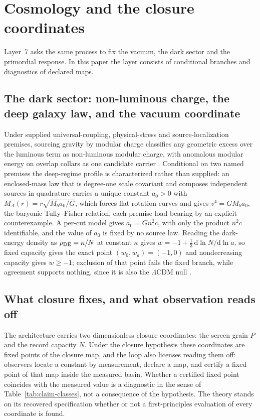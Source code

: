 \documentclass[11pt]{article}
\theoremstyle{definition}
\theoremstyle{remark}
\begin{document}
\section{Cosmology and the closure coordinates}
\label{sec:cosmology}

Layer~7 asks the same process to fix the vacuum, the dark sector and the
primordial response. In this paper the layer consists of conditional
branches and diagnostics of declared maps.

\subsection{The dark sector: non-luminous charge, the deep galaxy law, and the vacuum coordinate}
\label{sec:dark-sector}

Under supplied universal-coupling, physical-stress and source-localization
premises, sourcing gravity by modular charge classifies any geometric excess
over the luminous term as non-luminous modular charge, with anomalous
modular energy on overlap collars as one candidate carrier
\cite{ophdarkmatter}. Conditional on two named premises the deep-regime
profile is characterized rather than supplied: an enclosed-mass law that is
degree-one scale covariant and composes independent sources in quadrature
carries a unique constant $a_0>0$ with $M_A(r)=r\sqrt{M_ba_0/G}$, which forces flat rotation curves and
gives $v^4=GM_ba_0$, the baryonic Tully--Fisher relation, each premise
load-bearing by an explicit counterexample. A per-cut model
gives $a_0=Gn^2c$, with only the product $n^2c$ identifiable, and the value
of $a_0$ is fixed by no source law. Reading the dark-energy density as
$\rho_{\rm DE}=\kappa/N$ at constant $\kappa$ gives
$w=-1+\tfrac13\,\mathrm d\ln N/\mathrm d\ln a$, so fixed capacity gives the
exact point $(w_0,w_a)=(-1,0)$ and nondecreasing capacity gives $w\ge-1$;
exclusion of that point fails the fixed branch, while agreement supports
nothing, since it is also the $\Lambda$CDM null \cite{ophvacuum}.

\subsection{What closure fixes, and what observation reads off}
\label{sec:closure-principle}

The architecture carries two dimensionless closure coordinates: the screen
grain $P$ and the record capacity $N$. Under the closure hypothesis these coordinates are fixed points of the closure map, and the loop also licenses reading them off: observers locate a constant by measurement, declare a map, and certify a fixed point of that map inside the measured basin. Whether a certified fixed point coincides with the measured value is a diagnostic in the sense of Table~\ref{tab:claim-classes}, not a consequence of the hypothesis. The theory stands on its
recovered specification whether or not a first-principles evaluation of
every coordinate is found.
\end{document}
